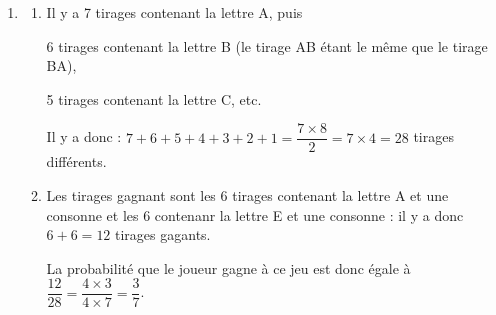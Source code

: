 \medskip









\begin{enumerate}
\item 
	\begin{enumerate}
		\item 
Il y a 7 tirages contenant la lettre A, puis 

6 tirages contenant la lettre B (le tirage AB étant le même que le tirage BA), 

5 tirages contenant la lettre C, etc.

Il y a donc : $7 + 6 + 5 + 4 + 3 + 2 + 1 = \dfrac{7 \times 8}{2}= 7 \times 4 = 28$ tirages différents.
		\item 
Les tirages gagnant sont les 6 tirages contenant la lettre A et une consonne et les 6 contenanr la lettre E et une consonne : il y a donc $6 + 6 = 12$ tirages gagants.

La probabilité que le joueur gagne à ce jeu est donc égale à $\dfrac{12}{28} = \dfrac{4\times 3}{4 \times 7} = \dfrac{3}{7}$.
	\end{enumerate}
\end{enumerate}
	





